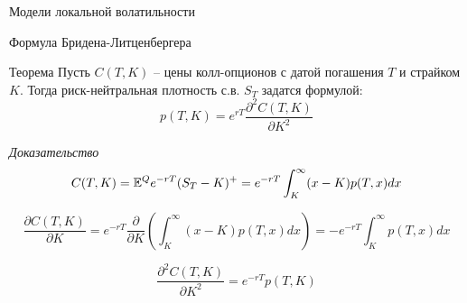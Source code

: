 \documentclass[aspectratio=169]{beamer}
\begin{document}
\begin{frame}{Модели локальной волатильности}
    \begin{itemize}
        
    \end{itemize}
\end{frame}

\begin{frame}{Формула Бридена-Литценбергера}
    \begin{block}{Теорема}
        Пусть $C(T, K)$ -- цены колл-опционов с датой погашения $T$ и страйком $K$. Тогда риск-нейтральная плотность с.в. $S_T$ задатся формулой:
        $$
            p(T, K) = e^{rT} \dfrac{\partial^2 C(T, K)}{\partial K^2 } 
        $$
    \end{block}
    \textit{Доказательство}
    $$
        C(T, K) = \mathbb{E}^Q e^{-rT} (S_T - K)^+ = 
        e^{-rT} \int_{K}^{\infty}(x-K) p(T, x) dx
    $$
    
    $$
        \dfrac{\partial C(T, K)}{\partial K }
        = e^{-rT} \dfrac{\partial}{\partial K} \left( \int_{K}^{\infty}(x-K) p(T, x) dx \right)
        = -e^{-rT} \int_{K}^{\infty}p(T, x) dx
    $$

    $$
    \dfrac{\partial^2 C(T, K)}{\partial K^2 }
    = e^{-rT} p(T, K)
    $$
\end{frame}
\end{document}
